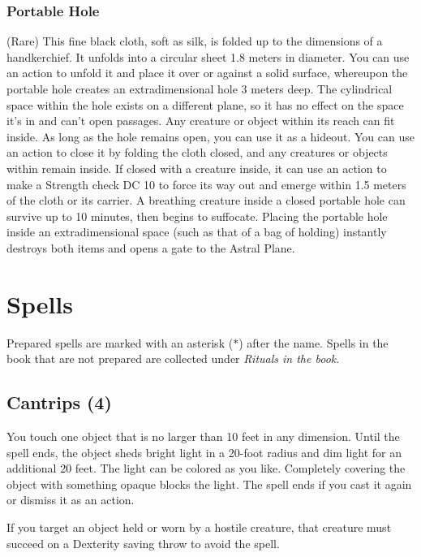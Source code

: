 \documentclass[letterpaper,twocolumn,openany,nodeprecatedcode,justified]{dndbook}
\begin{document}
\subsection*{Portable Hole} (Rare)
This fine black cloth, soft as silk, is folded up to the dimensions of a
handkerchief. It unfolds into a circular sheet 1.8 meters in diameter.
You can use an action to unfold it and place it over or against a solid
surface, whereupon the portable hole creates an extradimensional hole
3 meters deep. The cylindrical space within the hole exists on a
different plane, so it has no effect on the space it's in and can't open
passages. Any creature or object within its reach can fit inside. As long
as the hole remains open, you can use it as a hideout. You can use an
action to close it by folding the cloth closed, and any creatures or
objects within remain inside. If closed with a creature inside, it can
use an action to make a Strength check DC 10 to force its way out and
emerge within 1.5 meters of the cloth or its carrier. A breathing
creature inside a closed portable hole can survive up to 10 minutes, then
begins to suffocate. Placing the portable hole inside an extradimensional
space (such as that of a bag of holding) instantly destroys both items
and opens a gate to the Astral Plane.

\chapter*{Spells}

Prepared spells are marked with an asterisk ($\ast$) after the name. Spells in
the book that are not prepared are collected under \emph{Rituals in the book}.

\section{Cantrips (4)}


You touch one object that is no larger than 10 feet in any dimension. Until the spell ends, the object sheds bright light in a 20-foot radius and dim light for an additional 20 feet. The light can be colored as you like. Completely covering the object with something opaque blocks the light. The spell ends if you cast it again or dismiss it as an action.

If you target an object held or worn by a hostile creature, that creature must succeed on a Dexterity saving throw to avoid the spell.
\end{document}

